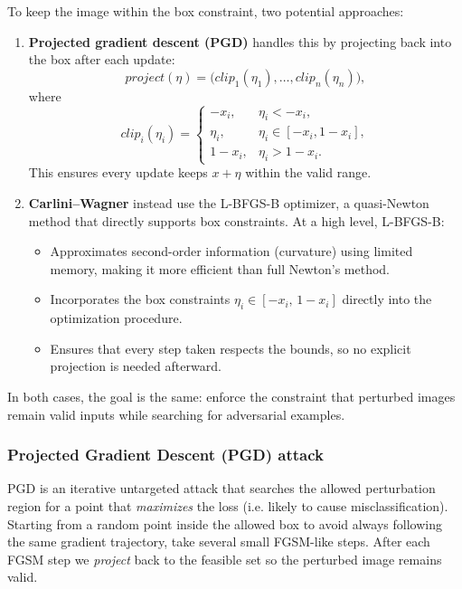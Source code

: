 \documentclass[11pt]{article}
\begin{document}
To keep the image within the box constraint, two potential approaches:
\begin{enumerate}
\item\textbf{Projected gradient descent (PGD)} handles this by projecting back into the box after each update:
\[
project(\eta) = \bigl(clip_1(\eta_1), \dots, clip_n(\eta_n)\bigr),
\]
where 
\[
clip_i(\eta_i) =
\begin{cases}
-x_i, & \eta_i < -x_i, \\
\eta_i, & \eta_i \in [-x_i, 1-x_i], \\
1-x_i, & \eta_i > 1-x_i.
\end{cases}
\]
This ensures every update keeps $x+\eta$ within the valid range.

\item\textbf{Carlini--Wagner} instead use the L-BFGS-B optimizer, a quasi-Newton method that directly supports box constraints. At a high level, L-BFGS-B:
\begin{itemize}[leftmargin=*]
    \item Approximates second-order information (curvature) using limited memory, making it more efficient than full Newton’s method.  
    \item Incorporates the box constraints $\eta_i \in [-x_i,\,1-x_i]$ directly into the optimization procedure.  
    \item Ensures that every step taken respects the bounds, so no explicit projection is needed afterward.  
\end{itemize}
\end{enumerate}

In both cases, the goal is the same: enforce the constraint that perturbed images remain valid inputs while searching for adversarial examples.

\subsubsection{Projected Gradient Descent (PGD) attack}

PGD is an iterative untargeted attack that searches the allowed perturbation region for a point that \emph{maximizes} the loss (i.e. likely to cause misclassification). Starting from a random point inside the allowed box to avoid always following the same gradient trajectory, take several small FGSM-like steps. After each FGSM step we \emph{project} back to the feasible set so the perturbed image remains valid.
\end{document}
